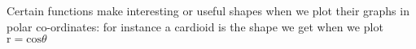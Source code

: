 Certain functions make interesting or useful shapes when we plot their
graphs in polar co-ordinates: for instance a cardioid is the shape we
get when we plot $ \mathrm{r = cos} \theta $